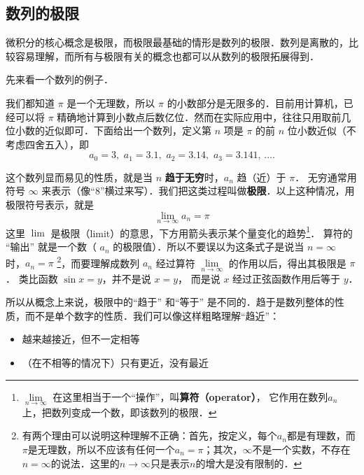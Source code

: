 
\subsection{数列的极限}

微积分的核心概念是极限，而极限最基础的情形是数列的极限．数列是离散的，比较容易理解，而所有与极限有关的概念也都可以从数列的极限拓展得到．

先来看一个数列的例子．

\begin{example}{}
我们都知道 $\pi$ 是一个无理数，所以 $\pi$ 的小数部分是无限多的．目前用计算机，已经可以将 $\pi$ 精确地计算到小数点后数亿位．然而在实际应用中，往往只用取前几位小数的近似即可．下面给出一个数列，定义第 $n$ 项是 $\pi$ 的前 $n$ 位小数近似（不考虑四舍五入），即
\begin{equation}
a_0 = 3,\,\, a_1 = 3.1,\,\, a_2 = 3.14,\,\, a_3 = 3.141,\,\dots.
\end{equation}
\end{example}

这个数列显而易见的性质，就是当 $n$ \textbf{趋于无穷}时，$a_n$ 趋（近）于 $\pi$． 无穷通常用符号 $\infty$ 来表示（像“8”横过来写）．我们把这类过程叫做\textbf{极限}．以上这种情况，用极限符号表示，就是
\begin{equation}
\lim_{n \to \infty } {a_n} = \pi 
\end{equation}
这里 $\lim$ 是极限（limit）的意思，下方用箭头表示某个量变化的趋势\footnote{$\lim\limits_{n \to \infty }$ 在这里相当于一个“操作”，叫\textbf{算符（operator）}， 它作用在数列$a_n$ 上，把数列变成一个数，即该数列的极限．}． 算符的 “输出” 就是一个数（ $a_n$ 的极限值）．所以不要误以为这条式子是说当 $n = \infty$ 时，$a_n=\pi$ \footnote{有两个理由可以说明这种理解不正确：首先，按定义，每个$a_n$都是有理数，而$\pi$是无理数，所以不应该有任何一个$a_n=\pi$；其次，$\infty$不是一个实数，不存在$n=\infty$的说法．这里的$n\to\infty$只是表示$n$的增大是没有限制的．}，而要理解成数列 $a_n$ 经过算符 $\lim\limits_{n \to \infty }$ 的作用以后，得出其极限是 $\pi$． 类比函数 $\sin x = y$，并不是说 $x=y$， 而是说 $x$ 经过正弦函数作用后等于 $y$． 

所以从概念上来说，极限中的“趋于” 和“等于” 是不同的．趋于是数列整体的性质，而不是单个数字的性质．我们可以像这样粗略理解“趋近”：
\begin{itemize}
\item 越来越接近，但不一定相等
\item （在不相等的情况下）只有更近，没有最近
\end{itemize}

